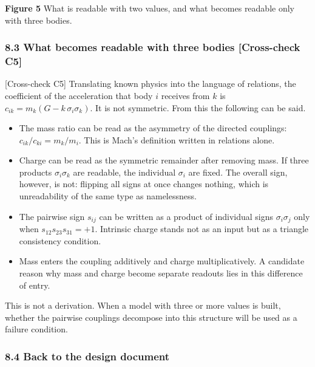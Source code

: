 \documentclass[
  a4paper,
]{article}
\providecommand{\tightlist}{%
  \setlength{\itemsep}{0pt}\setlength{\parskip}{0pt}}
\begin{document}
\textbf{Figure 5} What is readable with two values, and what becomes
readable only with three bodies.

\subsubsection{8.3 What becomes readable with three bodies
{[}Cross-check
C5{]}}\label{what-becomes-readable-with-three-bodies-cross-check-c5}

{[}Cross-check C5{]} Translating known physics into the language of
relations, the coefficient of the acceleration that body \(i\) receives
from \(k\) is \(c_{ik}=m_k(G-k\,\sigma_i\sigma_k)\). It is not
symmetric. From this the following can be said.

\begin{itemize}
\tightlist
\item
  The mass ratio can be read as the asymmetry of the directed couplings:
  \(c_{ik}/c_{ki}=m_k/m_i\). This is Mach's definition written in
  relations alone.
\item
  Charge can be read as the symmetric remainder after removing mass. If
  three products \(\sigma_i\sigma_k\) are readable, the individual
  \(\sigma_i\) are fixed. The overall sign, however, is not: flipping
  all signs at once changes nothing, which is unreadability of the same
  type as namelessness.
\item
  The pairwise sign \(s_{ij}\) can be written as a product of individual
  signs \(\sigma_i\sigma_j\) only when \(s_{12}s_{23}s_{31}=+1\).
  Intrinsic charge stands not as an input but as a triangle consistency
  condition.
\item
  Mass enters the coupling additively and charge multiplicatively. A
  candidate reason why mass and charge become separate readouts lies in
  this difference of entry.
\end{itemize}

This is not a derivation. When a model with three or more values is
built, whether the pairwise couplings decompose into this structure will
be used as a failure condition.

\subsubsection{8.4 Back to the design
document}\label{back-to-the-design-document}
\end{document}
